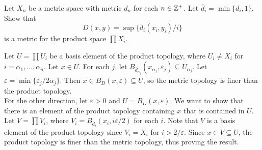 	\begin{exercise}
		Let $X_n$ be a metric space with metric $d_n$ for each $n\in\mathbb{Z}^+$.
			Let $\overline{d}_i=\min\{d_i,1\}$. Show that
			\[ D(x,y) = \sup \{\overline{d}_i(x_i,y_i)/i\} \]
			is a metric for the product space $\prod X_i$.
	\end{exercise}
	\begin{solution*}

			Let $U = \prod U_i$ be a basis element of the product topology, where $U_i\neq X_i$ for $i=\alpha_1,\ldots,\alpha_n$. Let $x\in U$. For each $j$, let $B_{\overline{d}_{\alpha_j}}(x_{\alpha_j},\varepsilon_j)\subseteq U_{\alpha_j}$. Let $\varepsilon = \min\{\varepsilon_j/2\alpha_j\}$. Then $x\in B_{D}(x,\varepsilon)\subseteq U$, so the metric topology is finer than the product topology.\\
			For the other direction, let $\varepsilon>0$ and $U=B_D(x,\varepsilon)$. We want to show that there is an element of the product topology containing $x$ that is contained in $U$. Let $V=\prod V_i$, where $V_i = B_{\overline{d}_i}(x_i, i\varepsilon/2)$ for each $i$. Note that $V$ is a basis element of the product topology since $V_i=X_i$ for $i>2/\varepsilon$. Since $x\in V\subseteq U$, the product topology is finer than the metric topology, thus proving the result.
	\end{solution*}


